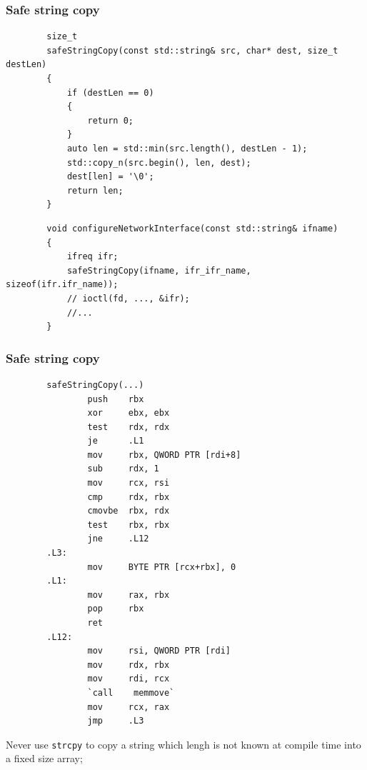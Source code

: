 \documentclass{beamer}
\begin{document}
\begin{frame}[fragile]
\frametitle{Safe string copy}
    \begin{lstlisting}
        size_t
        safeStringCopy(const std::string& src, char* dest, size_t destLen)
        {
            if (destLen == 0)
            {
                return 0;
            }
            auto len = std::min(src.length(), destLen - 1);
            std::copy_n(src.begin(), len, dest);
            dest[len] = '\0';
            return len;
        }
    \end{lstlisting}

    \pause
    \begin{lstlisting}
        void configureNetworkInterface(const std::string& ifname)
        {
            ifreq ifr;
            safeStringCopy(ifname, ifr_ifr_name, sizeof(ifr.ifr_name));
            // ioctl(fd, ..., &ifr);
            //...
        }
    \end{lstlisting}
    
\end{frame}

\begin{frame}[fragile]
\frametitle{Safe string copy}
    \begin{lstlisting}
        safeStringCopy(...)
                push    rbx
                xor     ebx, ebx
                test    rdx, rdx
                je      .L1
                mov     rbx, QWORD PTR [rdi+8]
                sub     rdx, 1
                mov     rcx, rsi
                cmp     rdx, rbx
                cmovbe  rbx, rdx
                test    rbx, rbx
                jne     .L12
        .L3:
                mov     BYTE PTR [rcx+rbx], 0
        .L1:
                mov     rax, rbx
                pop     rbx
                ret
        .L12:
                mov     rsi, QWORD PTR [rdi]
                mov     rdx, rbx
                mov     rdi, rcx
                `call    memmove`
                mov     rcx, rax
                jmp     .L3
    \end{lstlisting}
\end{frame}

\begin{frame}
    Never use \texttt{strcpy} to copy a string which lengh is not known at compile time into
    a fixed size array;
\end{frame}
\end{document}

